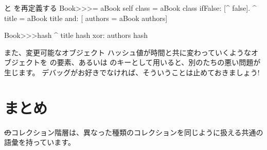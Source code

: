 \documentclass[a4paper,10pt,twoside]{book}
\begin{document}
\begin{method}{\lct{=} と  を再定義する}
Book>>>= aBook
   self class = aBook class ifFalse: [^ false].
   ^ title = aBook title and: [ authors = aBook authors]

Book>>>hash 
   ^ title hash xor: authors hash
\end{method}

また、変更可能なオブジェクト \ie ハッシュ値が時間と共に変わっていくようなオブジェクトを  の要素、あるいは  のキーとして用いると、別のたちの悪い問題が生じます。
デバッグがお好きでなければ、そういうことは止めておきましょう!

\section{まとめ}

\st のコレクション階層は、異なった種類のコレクションを同じように扱える共通の語彙を持っています。
\end{document}
